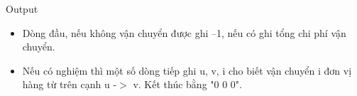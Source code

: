 Output
\begin{itemize}
	\item Dòng đầu, nếu không vận chuyển được ghi –1, nếu có ghi tổng chi phí vận chuyển.
	\item Nếu có nghiệm thì một số dòng tiếp ghi u, v, i cho biết vận chuyển i đơn vị hàng từ trên cạnh u -$>$ v. Kết thúc bằng "0 0 0".
\end{itemize}